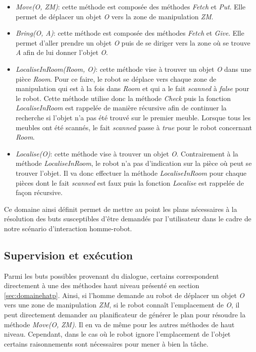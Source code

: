 \documentclass[a4paper,11pt,twoside]{StyleThese}
\begin{document}
\begin{itemize}

\item \textit{Move(O, ZM)}: cette méthode est composée des méthodes \textit{Fetch} et \textit{Put}. Elle permet de déplacer un objet \textit{O} vers la zone de manipulation \textit{ZM}.

\item \textit{Bring(O, A)}: cette méthode est composée des méthodes \textit{Fetch} et \textit{Give}. Elle permet d'aller prendre un objet \textit{O} puis de se diriger vers la zone où se trouve \textit{A} afin de lui donner l'objet \textit{O}.

\item \textit{LocaliseInRoom(Room, O)}: cette méthode vise à trouver un objet \textit{O} dans une pièce \textit{Room}. Pour ce faire, le robot se déplace vers chaque zone de manipulation qui est à la fois dans \textit{Room} et qui a le fait \textit{scanned} à \textit{false} pour le robot. Cette méthode utilise donc la méthode \textit{Check} puis la fonction \textit{LocaliseInRoom} est rappelée de manière récursive afin de continuer la recherche si l'objet n'a pas été trouvé sur le premier meuble.
Lorsque tous les meubles ont été scannés, le fait \textit{scanned} passe à \textit{true} pour le robot concernant \textit{Room}.

\item \textit{Localise(O)}: cette méthode vise à trouver un objet \textit{O}. Contrairement à la méthode \textit{LocaliseInRoom}, le robot n'a pas d'indication sur la pièce où peut se trouver l'objet. Il va donc effectuer la méthode \textit{LocaliseInRoom} pour chaque pièces dont le fait \textit{scanned} est faux puis la fonction \textit{Localise} est rappelée de façon récursive.
\end{itemize}

Ce domaine ainsi définit permet de mettre au point les plans nécessaires à la résolution des buts susceptibles d'être demandés par l'utilisateur dans le cadre de notre scénario d'interaction homme-robot.


\subsection{Supervision et exécution}

Parmi les buts possibles provenant du dialogue, certains correspondent directement à une des méthodes haut niveau présenté en section \ref{sec:domainehatp}.
Ainsi, si l'homme demande au robot de déplacer un objet \textit{O} vers une zone de manipulation \textit{ZM}, si le robot connaît l'emplacement de \textit{O}, il peut directement demander au planificateur de générer le plan pour résoudre la méthode \textit{Move(O, ZM)}. Il en va de même pour les autres méthodes de haut niveau. Cependant, dans le cas où le robot ignore l'emplacement de l'objet certains raisonnements sont nécessaires pour mener à bien la tâche.
\end{document}
